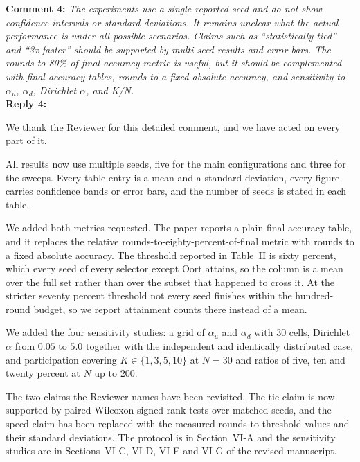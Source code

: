 \documentclass[10pt]{article}
\begin{document}
\noindent
\textbf{Comment 4:} \textit{The experiments use a single reported seed and do not show confidence intervals or standard deviations. It remains unclear what the actual performance is under all possible scenarios. Claims such as ``statistically tied'' and ``3x faster'' should be supported by multi-seed results and error bars. The rounds-to-80\%-of-final-accuracy metric is useful, but it should be complemented with final accuracy tables, rounds to a fixed absolute accuracy, and sensitivity to $\alpha_u$, $\alpha_d$, Dirichlet $\alpha$, and K/N.} \\
\noindent
\textbf{Reply 4:} {We thank the Reviewer for this detailed comment, and we have acted on every part of it.

All results now use multiple seeds, five for the main configurations and three for the sweeps. Every table entry is a mean and a standard deviation, every figure carries confidence bands or error bars, and the number of seeds is stated in each table.

We added both metrics requested. The paper reports a plain final-accuracy table, and it replaces the relative rounds-to-eighty-percent-of-final metric with rounds to a fixed absolute accuracy. The threshold reported in Table~II is sixty percent, which every seed of every selector except Oort attains, so the column is a mean over the full set rather than over the subset that happened to cross it. At the stricter seventy percent threshold not every seed finishes within the hundred-round budget, so we report attainment counts there instead of a mean.

We added the four sensitivity studies: a grid of $\alpha_u$ and $\alpha_d$ with $30$ cells, Dirichlet $\alpha$ from $0.05$ to $5.0$ together with the independent and identically distributed case, and participation covering $K \in \{1, 3, 5, 10\}$ at $N = 30$ and ratios of five, ten and twenty percent at $N$ up to $200$.

The two claims the Reviewer names have been revisited. The tie claim is now supported by paired Wilcoxon signed-rank tests over matched seeds, and the speed claim has been replaced with the measured rounds-to-threshold values and their standard deviations. The protocol is in Section~VI-A and the sensitivity studies are in Sections~VI-C, VI-D, VI-E and VI-G of the revised manuscript.}\\
\end{document}
